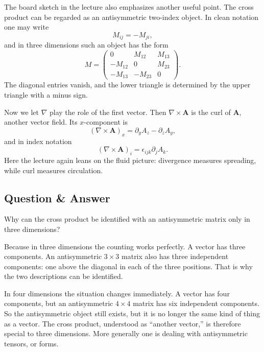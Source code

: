 The board sketch in the lecture also emphasizes another useful point. The cross product can be regarded as an antisymmetric two-index object. In clean notation one may write
\begin{equation}
M_{ij}=-M_{ji},
\end{equation}
and in three dimensions such an object has the form
\begin{equation}
M=
\left(
\begin{array}{ccc}
0 & M_{12} & M_{13}\\
-M_{12} & 0 & M_{23}\\
-M_{13} & -M_{23} & 0
\end{array}
\right).
\end{equation}
The diagonal entries vanish, and the lower triangle is determined by the upper triangle with a minus sign.

Now we let \(\nabla\) play the role of the first vector. Then \(\nabla\times \mathbf A\) is the curl of \(\mathbf A\), another vector field. Its \(x\)-component is
\begin{equation}
(\nabla\times \mathbf A)_x=\partial_yA_z-\partial_zA_y,
\end{equation}
and in index notation
\begin{equation}
(\nabla\times \mathbf A)_i=\epsilon_{ijk}\partial_jA_k.
\end{equation}
Here the lecture again leans on the fluid picture: divergence measures spreading, while curl measures circulation.

\subsection{Question \& Answer}

Why can the cross product be identified with an antisymmetric matrix only in three dimensions?

Because in three dimensions the counting works perfectly. A vector has three components. An antisymmetric \(3\times 3\) matrix also has three independent components: one above the diagonal in each of the three positions. That is why the two descriptions can be identified.

In four dimensions the situation changes immediately. A vector has four components, but an antisymmetric \(4\times 4\) matrix has six independent components. So the antisymmetric object still exists, but it is no longer the same kind of thing as a vector. The cross product, understood as ``another vector,'' is therefore special to three dimensions. More generally one is dealing with antisymmetric tensors, or forms.

